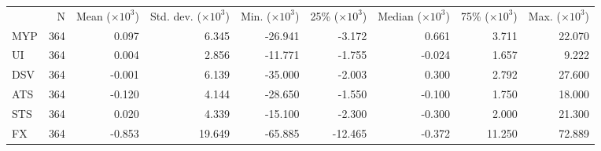 \begin{tabular}{lrrrrrrrr}
 & N & Mean ($\times 10^3$) & Std. dev. ($\times 10^3$) & Min. ($\times 10^3$) & 25\% ($\times 10^3$) & Median ($\times 10^3$) & 75\% ($\times 10^3$) & Max. ($\times 10^3$) \\
MYP & 364 & 0.097 & 6.345 & -26.941 & -3.172 & 0.661 & 3.711 & 22.070 \\
UI & 364 & 0.004 & 2.856 & -11.771 & -1.755 & -0.024 & 1.657 & 9.222 \\
DSV & 364 & -0.001 & 6.139 & -35.000 & -2.003 & 0.300 & 2.792 & 27.600 \\
ATS & 364 & -0.120 & 4.144 & -28.650 & -1.550 & -0.100 & 1.750 & 18.000 \\
STS & 364 & 0.020 & 4.339 & -15.100 & -2.300 & -0.300 & 2.000 & 21.300 \\
FX & 364 & -0.853 & 19.649 & -65.885 & -12.465 & -0.372 & 11.250 & 72.889 \\
\end{tabular}
